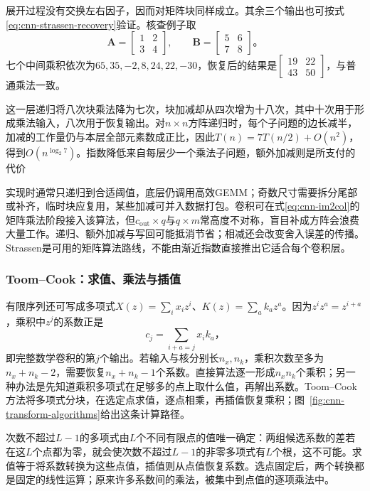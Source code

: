 展开过程没有交换左右因子，因而对矩阵块同样成立。其余三个输出也可按式\eqref{eq:cnn-strassen-recovery}验证。核查例子取
\[
  \bm A=\begin{bmatrix}1&2\\3&4\end{bmatrix},\qquad
  \bm B=\begin{bmatrix}5&6\\7&8\end{bmatrix}\text{。}
\]
七个中间乘积依次为$65,35,-2,8,24,22,-30$，恢复后的结果是$\left[\begin{smallmatrix}19&22\\43&50\end{smallmatrix}\right]$，与普通乘法一致。

这一层递归将八次块乘法降为七次，块加减却从四次增为十八次，其中十次用于形成乘法输入，八次用于恢复输出。对$n\times n$方阵递归时，每个子问题的边长减半，加减的工作量仍与本层全部元素数成正比，因此$T(n)=7T(n/2)+O(n^2)$，得到$O(n^{\log_2 7})$。指数降低来自每层少一个乘法子问题，额外加减则是所支付的代价

实现时通常只递归到合适阈值，底层仍调用高效GEMM；奇数尺寸需要拆分尾部或补齐，临时块应复用，某些加减可并入数据打包。卷积可在式\eqref{eq:cnn-im2col}的矩阵乘法阶段接入该算法，但$c_{\mathrm{out}}\times q$与$q\times m$常高度不对称，盲目补成方阵会浪费大量工作。递归、额外加减与写回可能抵消节省；相减还会改变舍入误差的传播。Strassen是可用的矩阵算法路线，不能由渐近指数直接推出它适合每个卷积层。

\subsubsection{Toom--Cook：求值、乘法与插值}
\label{sec:cnn-toom-cook}

有限序列还可写成多项式$X(z)=\sum_i x_i z^i$、$K(z)=\sum_a k_a z^a$。因为$z^i z^a=z^{i+a}$，乘积中$z^j$的系数正是
\[
  c_j=\sum_{i+a=j}x_i k_a\text{，}
\]
即完整数学卷积的第$j$个输出。若输入与核分别长$n_x,n_k$，乘积次数至多为$n_x+n_k-2$，需要恢复$n_x+n_k-1$个系数。直接算法逐一形成$n_xn_k$个乘积；另一种办法是先知道乘积多项式在足够多的点上取什么值，再解出系数。Toom--Cook方法将多项式分块，在选定点求值，逐点相乘，再插值恢复乘积；图~\ref{fig:cnn-transform-algorithms}给出这条计算路径。

次数不超过$L-1$的多项式由$L$个不同有限点的值唯一确定：两组候选系数的差若在这$L$个点都为零，就会使次数不超过$L-1$的非零多项式有$L$个根，这不可能。求值等于将系数转换为这些点值，插值则从点值恢复系数。选点固定后，两个转换都是固定的线性运算；原来许多系数间的乘法，被集中到点值的逐项乘法中。

